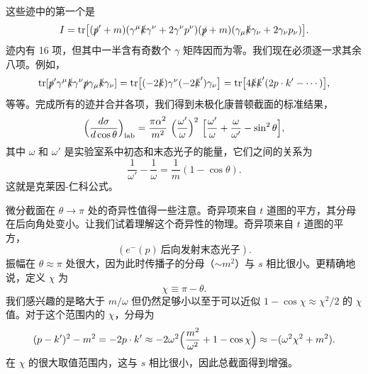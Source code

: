 这些迹中的第一个是
\begin{equation}
  I = \mathrm{tr}\bigl[ (\slashed{p}'+m)(\gamma^\mu\slashed{k}\gamma^\nu
    + 2\gamma^\nu p^\nu)(\slashed{p}+m)(\gamma_\mu\slashed{k}\gamma_\nu
      + 2\gamma_\nu p_\nu) \bigr] .
  \label{eq:5.84}
\end{equation}
迹内有 16 项，但其中一半含有奇数个 $\gamma$ 矩阵因而为零。我们现在必须逐一求其余八项。例如，
\begin{equation}
  \mathrm{tr}[\slashed{p}'\gamma^\mu\slashed{k}\gamma^\nu\slashed{p}
    \gamma_\mu\slashed{k}\gamma_\nu]
  = \mathrm{tr}\bigl[ (-2\slashed{k})\gamma^\nu(-2\slashed{k}')\gamma_\nu
    \bigr]
  = \mathrm{tr}\bigl[ 4\slashed{k}\slashed{k}'(2p\cdot k'-\cdots) \bigr],
\end{equation}
等等。完成所有的迹并合并各项，我们得到未极化康普顿截面的标准结果，
\begin{equation}
  \Bigl( \frac{d\sigma}{d\cos\theta} \Bigr)_{\mathrm{lab}}
    = \frac{\pi\alpha^2}{m^2}\ \Bigl(
      \frac{\omega'}{\omega} \Bigr)^2\ \Bigl[
        \frac{\omega'}{\omega} + \frac{\omega}{\omega'}
        - \sin^2\theta \Bigr] ,
  \label{eq:5.94}
\end{equation}
其中 $\omega$ 和 $\omega'$ 是实验室系中初态和末态光子的能量，它们之间的关系为
\begin{equation}
  \frac{1}{\omega'} - \frac{1}{\omega} = \frac{1}{m}(1-\cos\theta) .
  \label{eq:5.95}
\end{equation}
这就是克莱因-仁科公式。

微分截面在 $\theta\to\pi$ 处的奇异性值得一些注意。奇异项来自 $t$ 道图的平方，其分母在后向角处变小。让我们试着理解这个奇异性的物理。奇异项来自 $t$ 道图的平方，
\begin{equation}
  (e^{-}(p)\ \text{后向发射末态光子}).
\end{equation}
振幅在 $\theta\approx\pi$ 处很大，因为此时传播子的分母（$\sim m^2$）与 $s$ 相比很小。更精确地说，定义 $\chi$ 为
\begin{equation}
  \chi \equiv \pi - \theta .
\end{equation}
我们感兴趣的是略大于 $m/\omega$ 但仍然足够小以至于可以近似 $1-\cos\chi \approx \chi^2/2$ 的 $\chi$ 值。对于这个范围内的 $\chi$，分母为
\begin{equation}
  (p-k')^2 - m^2 = -2p\cdot k' \approx -2\omega^2\Bigl( \frac{m^2}{\omega^2}
    + 1 - \cos\chi \Bigr) \approx -(\omega^2\chi^2 + m^2) .
  \label{eq:5.98}
\end{equation}
在 $\chi$ 的很大取值范围内，这与 $s$ 相比很小，因此总截面得到增强。

